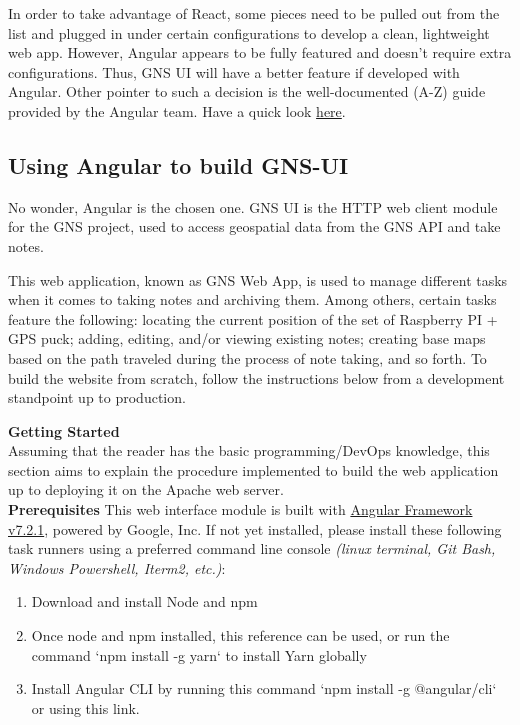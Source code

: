 In order to take advantage of React, some pieces need to be pulled out from the list and plugged in under certain configurations to develop a clean, lightweight web app. However, Angular appears to be fully featured and doesn’t require extra configurations. Thus, GNS UI will have a better feature if developed with Angular. Other pointer to such a decision is the well-documented (A-Z) guide provided by the Angular team. Have a quick look \href{https://angular.io/docs}{here}.

\vspace{1.0cm}
\noindent
\subsection{Using Angular to build GNS-UI}
No wonder, Angular is the chosen one. GNS UI is the HTTP web client module for the GNS project, used to access geospatial data from the GNS API and take notes.

This web application, known as GNS Web App, is used to manage different tasks when it comes to taking notes and archiving them. Among others, certain tasks feature the following: locating the current position of the set of Raspberry PI + GPS puck; adding, editing, and/or viewing existing notes; creating base maps based on the path traveled during the process of note taking, and so forth. To build the website from scratch, follow the instructions below from a development standpoint up to production.

\vspace{1.0cm}
\noindent
\textbf{Getting Started}\\
Assuming that the reader has the basic programming/DevOps knowledge, this section aims to explain the procedure implemented to build the web application up to deploying it on the Apache web server.\\

\noindent
\textbf{Prerequisites}
This web interface module is built with \href{https://angular.io}{Angular Framework v7.2.1}, powered by Google, Inc. If not yet installed, please install these following task runners using a preferred command line console \textit{(linux terminal, Git Bash, Windows Powershell, Iterm2, etc.)}:

\begin{enumerate}
    \item Download and install Node and npm
    \item Once node and npm installed, this reference can be used, or run the command `npm install -g yarn` to install Yarn globally
    \item Install Angular CLI by running this command `npm install -g @angular/cli` or using this link.
\end{enumerate}

